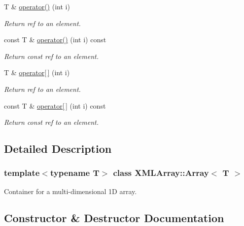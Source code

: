 \begin{DoxyCompactItemize}
T \& \mbox{\hyperlink{classXMLArray_1_1Array_aaa5b7fcaa413265173fc75d3a5bbf837}{operator()}} (int i)
\begin{DoxyCompactList}\small\item\em Return ref to an element. \end{DoxyCompactList}\item 
const T \& \mbox{\hyperlink{classXMLArray_1_1Array_a6935c8d1efcf82e7c751717a94e7c145}{operator()}} (int i) const
\begin{DoxyCompactList}\small\item\em Return const ref to an element. \end{DoxyCompactList}\item 
T \& \mbox{\hyperlink{classXMLArray_1_1Array_a42dbfab67d875b6fa456cade78f70f8f}{operator\mbox{[}$\,$\mbox{]}}} (int i)
\begin{DoxyCompactList}\small\item\em Return ref to an element. \end{DoxyCompactList}\item 
const T \& \mbox{\hyperlink{classXMLArray_1_1Array_a8e51d308c4e6b81cdbf1be40377afda8}{operator\mbox{[}$\,$\mbox{]}}} (int i) const
\begin{DoxyCompactList}\small\item\em Return const ref to an element. \end{DoxyCompactList}\end{DoxyCompactItemize}


\subsection{Detailed Description}
\subsubsection*{template$<$typename T$>$\newline
class X\+M\+L\+Array\+::\+Array$<$ T $>$}

Container for a multi-\/dimensional 1D array. 

\subsection{Constructor \& Destructor Documentation}
\mbox{\label{classXMLArray_1_1Array_a5b81635bef141ec21cbb11a4ae235aff}} 

